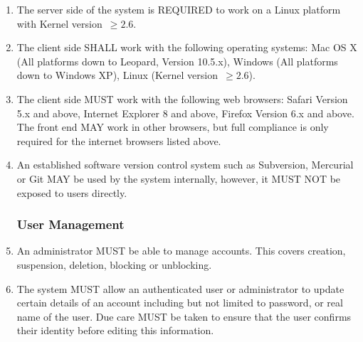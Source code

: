 \begin{enumerate}[1]
\item The server side of the system is REQUIRED to work on a Linux platform with Kernel version~$\ge 2.6$. 

\item The client side SHALL work with the following operating systems: Mac OS X (All platforms down to Leopard, Version 10.5.x), Windows (All platforms down to Windows XP), Linux (Kernel version~$\ge 2.6$).

\item The client side MUST work with the following web browsers: Safari Version 5.x and above, Internet Explorer 8 and above, Firefox Version 6.x and above. The front end MAY work in other browsers, but full compliance is only required for the internet browsers listed above.

\item An established software version control system such as Subversion, Mercurial or Git MAY be used by the system internally, however, it MUST NOT be exposed to users directly.

\subsubsection{ User Management}
\item An administrator MUST be able to manage accounts. This covers creation, suspension, deletion, blocking or unblocking.

\item The system MUST allow an authenticated user or administrator to update certain details of an account including but not limited to password, or real name of the user. Due care MUST be taken to ensure that the user confirms their identity before editing this information.
\end{enumerate}

